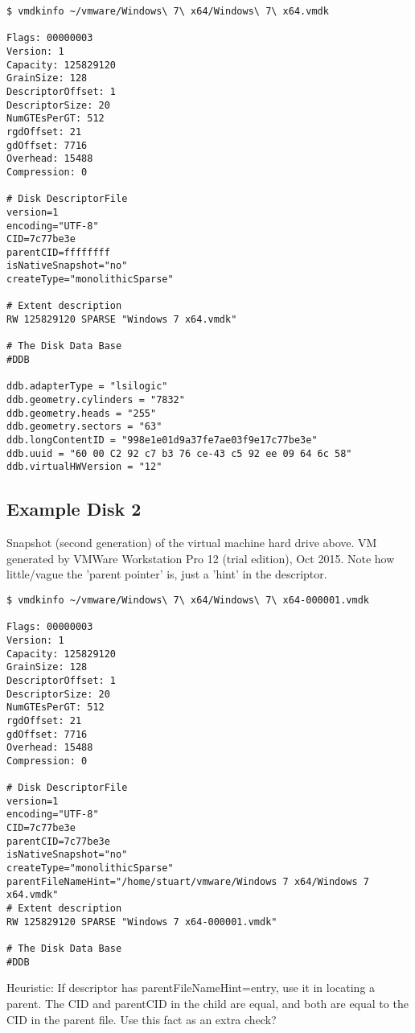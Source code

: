 \documentclass{article}
\begin{document}
\begin{verbatim}
$ vmdkinfo ~/vmware/Windows\ 7\ x64/Windows\ 7\ x64.vmdk 

Flags: 00000003
Version: 1
Capacity: 125829120
GrainSize: 128
DescriptorOffset: 1
DescriptorSize: 20
NumGTEsPerGT: 512
rgdOffset: 21
gdOffset: 7716
Overhead: 15488
Compression: 0

# Disk DescriptorFile
version=1
encoding="UTF-8"
CID=7c77be3e
parentCID=ffffffff
isNativeSnapshot="no"
createType="monolithicSparse"

# Extent description
RW 125829120 SPARSE "Windows 7 x64.vmdk"

# The Disk Data Base 
#DDB

ddb.adapterType = "lsilogic"
ddb.geometry.cylinders = "7832"
ddb.geometry.heads = "255"
ddb.geometry.sectors = "63"
ddb.longContentID = "998e1e01d9a37fe7ae03f9e17c77be3e"
ddb.uuid = "60 00 C2 92 c7 b3 76 ce-43 c5 92 ee 09 64 6c 58"
ddb.virtualHWVersion = "12"
\end{verbatim}

\subsection{Example Disk 2}

Snapshot (second generation) of the virtual machine hard drive
above. VM generated by VMWare Workstation Pro 12 (trial edition), Oct
2015.  Note how little/vague the 'parent pointer' is, just a 'hint' in
the descriptor.
  
\begin{verbatim}
$ vmdkinfo ~/vmware/Windows\ 7\ x64/Windows\ 7\ x64-000001.vmdk 

Flags: 00000003
Version: 1
Capacity: 125829120
GrainSize: 128
DescriptorOffset: 1
DescriptorSize: 20
NumGTEsPerGT: 512
rgdOffset: 21
gdOffset: 7716
Overhead: 15488
Compression: 0

# Disk DescriptorFile
version=1
encoding="UTF-8"
CID=7c77be3e
parentCID=7c77be3e
isNativeSnapshot="no"
createType="monolithicSparse"
parentFileNameHint="/home/stuart/vmware/Windows 7 x64/Windows 7 x64.vmdk"
# Extent description
RW 125829120 SPARSE "Windows 7 x64-000001.vmdk"

# The Disk Data Base 
#DDB
\end{verbatim}

Heuristic: If descriptor has parentFileNameHint=entry, use it in locating
a parent.  The CID and parentCID in the child are equal, and both are
equal to the CID in the parent file.  Use this fact as an extra check?
\end{document}
